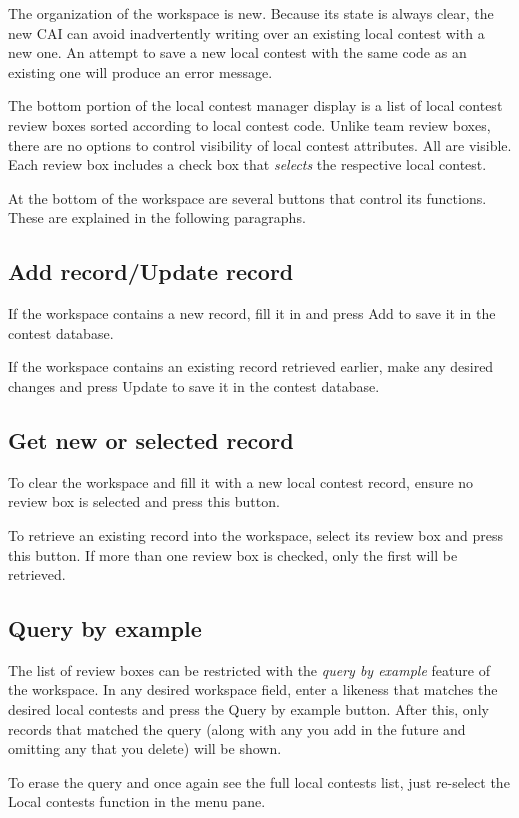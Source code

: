 \documentclass[11pt,letterpaper]{refart}
\def\ui#1{\textsf{#1}}
\begin{document}
The organization of the workspace is new. Because its state is always
clear, the new CAI can avoid inadvertently writing over an existing
local contest with a new one. An attempt to save a new local contest
with the same code as an existing one will produce an error
message.

The bottom portion of the local contest manager display is a list of
local contest review boxes sorted according to local contest code.
Unlike team review boxes, there are no options to control visibility
of local contest attributes. All are visible. Each review box includes
a check box that \emph{selects} the respective local contest.

At the bottom of the workspace are several buttons that control its
functions. These are explained in the following paragraphs.

\subsection{Add record/Update record}
If the workspace contains a new record, fill it in and press \ui{Add}
to save it in the contest database.

If the workspace contains an existing record retrieved earlier, make
any desired changes and press \ui{Update} to save it in the contest
database.

\subsection{Get new or selected record}
To clear the workspace and fill it with a new local contest record,
ensure no review box is selected and press this button.

To retrieve an existing record into the workspace, select its review
box and press this button. If more than one review box is checked,
only the first will be retrieved.

\subsection{Query by example}
\label{sec:qbe}
The list of review boxes can be restricted with the \emph{query by example} 
feature of the workspace. In any desired workspace field,
enter a likeness that matches the desired local contests and press the
\ui{Query by example} button. After this, only records that matched
the query (along with any you add in the future and omitting any that
you delete) will be shown.

To erase the query and once again see the full local contests list,
just re-select the \ui{Local contests} function in the menu pane.
\end{document}
